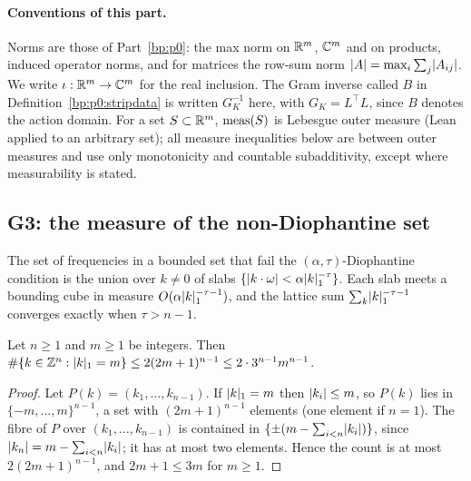 \paragraph{Conventions of this part.} Norms are those of Part~\ref{bp:p0}: the max norm on
$\mathbb{R}^m$, $\mathbb{C}^m$ and on products, induced operator norms, and for matrices the row-sum norm
$\lvert A\rvert=\max_i\sum_j\lvert A_{ij}\rvert$. We write $\iota:\mathbb{R}^m\to\mathbb{C}^m$ for the real inclusion. The
Gram inverse called $B$ in Definition~\ref{bp:p0:stripdata} is written $G_K^{-1}$ here, with
$G_K=L^\top L$, since $B$ denotes the action domain. For a set $S\subset\mathbb{R}^m$, $\operatorname{meas}(S)$ is
Lebesgue outer measure (Lean  applied to an arbitrary set); all measure inequalities
below are between outer measures and use only monotonicity and countable subadditivity, except
where measurability is stated.

\subsection{G3: the measure of the non-Diophantine set}\label{bp:p4:sec-g3}

The set of frequencies in a bounded set that fail the $(\alpha,\tau)$-Diophantine condition is the
union over $k\ne0$ of slabs $\{\lvert k\cdot\omega\rvert<\alpha\lvert k\rvert_1^{-\tau}\}$. Each slab meets a
bounding cube in measure $O(\alpha\lvert k\rvert_1^{-\tau-1})$, and the lattice sum
$\sum_k\lvert k\rvert_1^{-\tau-1}$ converges exactly when $\tau>n-1$.

\begin{lemma}\label{bp:p4:lattice-count}
Let $n\ge1$ and $m\ge1$ be integers. Then $\#\{k\in\mathbb{Z}^n:\lvert k\rvert_1=m\}\le2(2m+1)^{n-1}\le2\cdot3^{n-1}m^{n-1}$.
\end{lemma}

\begin{proof}
\label{step:p4:count-projection}
Let $P(k)=(k_1,\dots,k_{n-1})$. If $\lvert k\rvert_1=m$ then $\lvert k_i\rvert\le m$, so $P(k)$ lies in
$\{-m,\dots,m\}^{n-1}$, a set with $(2m+1)^{n-1}$ elements (one element if $n=1$). The fibre of $P$
over $(k_1,\dots,k_{n-1})$ is contained in $\{\pm(m-\sum_{i<n}\lvert k_i\rvert)\}$, since
$\lvert k_n\rvert=m-\sum_{i<n}\lvert k_i\rvert$; it has at most two elements. Hence the count is at most
$2(2m+1)^{n-1}$, and $2m+1\le3m$ for $m\ge1$.
\end{proof}

